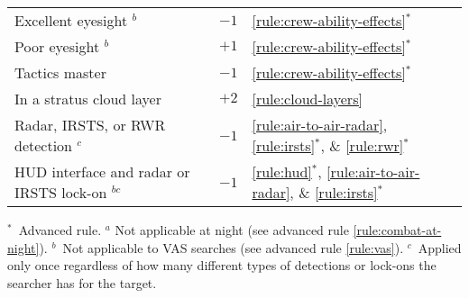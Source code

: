 {\begin{twocolumntablefloat}
\begin{twocolumntable}
\begin{tabularx}{0.6\linewidth}{Xll}
Excellent eyesight $^b$&$-1$&\ref{rule:crew-ability-effects}$^*$\\
Poor eyesight $^b$&$+1$&\ref{rule:crew-ability-effects}$^*$\\
Tactics master&$-1$&\ref{rule:crew-ability-effects}$^*$\\
In a stratus cloud layer&$+2$&\ref{rule:cloud-layers}\\
Radar, IRSTS, or RWR detection $^c$&$-1$&\ref{rule:air-to-air-radar}, \ref{rule:irsts}$^*$, \& \ref{rule:rwr}$^*$\\
HUD interface and radar or IRSTS lock-on $^{bc}$&$-1$& \ref{rule:hud}$^*$, \ref{rule:air-to-air-radar}, \& \ref{rule:irsts}$^*$\\
\bottomrule
\end{tabularx}
\begin{tablenote}{0.6\linewidth}
$^*$~Advanced rule. $^a$ Not applicable at night (see advanced rule \ref{rule:combat-at-night}). $^b$~Not applicable to VAS searches (see advanced rule \ref{rule:vas}). $^c$~Applied only once regardless of how many different types of detections or lock-ons the searcher has for the target.
\end{tablenote}
\end{twocolumntable}


\end{twocolumntablefloat}
}
